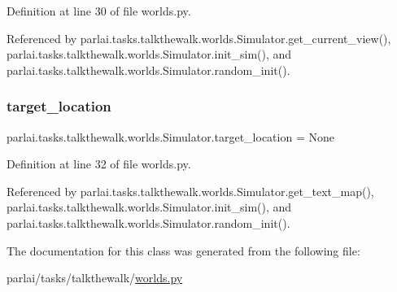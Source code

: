 Definition at line 30 of file worlds.\+py.



Referenced by parlai.\+tasks.\+talkthewalk.\+worlds.\+Simulator.\+get\+\_\+current\+\_\+view(), parlai.\+tasks.\+talkthewalk.\+worlds.\+Simulator.\+init\+\_\+sim(), and parlai.\+tasks.\+talkthewalk.\+worlds.\+Simulator.\+random\+\_\+init().

\mbox{\label{classparlai_1_1tasks_1_1talkthewalk_1_1worlds_1_1Simulator_a3d22320d10a2fea9c185be6a0e7bc1fb}} 
\subsubsection{\texorpdfstring{target\+\_\+location}{target\_location}}
{\footnotesize\ttfamily parlai.\+tasks.\+talkthewalk.\+worlds.\+Simulator.\+target\+\_\+location = None\hspace{0.3cm}{\ttfamily [static]}}



Definition at line 32 of file worlds.\+py.



Referenced by parlai.\+tasks.\+talkthewalk.\+worlds.\+Simulator.\+get\+\_\+text\+\_\+map(), parlai.\+tasks.\+talkthewalk.\+worlds.\+Simulator.\+init\+\_\+sim(), and parlai.\+tasks.\+talkthewalk.\+worlds.\+Simulator.\+random\+\_\+init().



The documentation for this class was generated from the following file\+:\begin{DoxyCompactItemize}
\item 
parlai/tasks/talkthewalk/\hyperlink{parlai_2tasks_2talkthewalk_2worlds_8py}{worlds.\+py}\end{DoxyCompactItemize}
